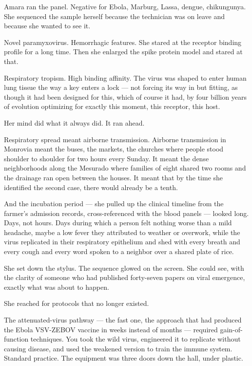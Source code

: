 \documentclass[11pt]{article}
\begin{document}
Amara ran the panel. Negative for Ebola, Marburg, Lassa, dengue, chikungunya. She sequenced the sample herself because the technician was on leave and because she wanted to see it.

Novel paramyxovirus. Hemorrhagic features. She stared at the receptor binding profile for a long time. Then she enlarged the spike protein model and stared at that.

Respiratory tropism. High binding affinity. The virus was shaped to enter human lung tissue the way a key enters a lock --- not forcing its way in but fitting, as though it had been designed for this, which of course it had, by four billion years of evolution optimizing for exactly this moment, this receptor, this host.

Her mind did what it always did. It ran ahead.

Respiratory spread meant airborne transmission. Airborne transmission in Monrovia meant the buses, the markets, the churches where people stood shoulder to shoulder for two hours every Sunday. It meant the dense neighborhoods along the Mesurado where families of eight shared two rooms and the drainage ran open between the houses. It meant that by the time she identified the second case, there would already be a tenth.

And the incubation period --- she pulled up the clinical timeline from the farmer's admission records, cross-referenced with the blood panels --- looked long. Days, not hours. Days during which a person felt nothing worse than a mild headache, maybe a low fever they attributed to weather or overwork, while the virus replicated in their respiratory epithelium and shed with every breath and every cough and every word spoken to a neighbor over a shared plate of rice.

She set down the stylus. The sequence glowed on the screen. She could see, with the clarity of someone who had published forty-seven papers on viral emergence, exactly what was about to happen.

She reached for protocols that no longer existed.

The attenuated-virus pathway --- the fast one, the approach that had produced the Ebola VSV-ZEBOV vaccine in weeks instead of months --- required gain-of-function techniques. You took the wild virus, engineered it to replicate without causing disease, and used the weakened version to train the immune system. Standard practice. The equipment was three doors down the hall, under plastic.
\end{document}
